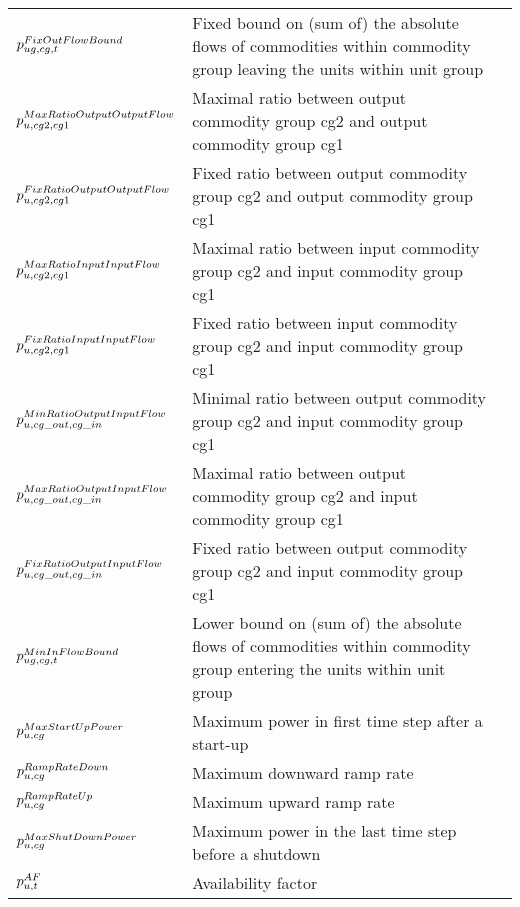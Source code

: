 \begin{longtable}{p{\cola} p{\colc} >{\small\raggedleft\arraybackslash\itshape}p{\colb}}
		$p^{FixOutFlowBound}_{ug,cg,t}$	& Fixed bound on (sum of) the absolute flows of commodities within commodity group \commoditygroup leaving the units within unit group \unitgroup 	&                \\
		$p^{MaxRatioOutputOutputFlow}_{u,cg2,cg1}$	& Maximal ratio between output commodity group cg2 and output commodity group cg1	&                \\
		$p^{FixRatioOutputOutputFlow}_{u,cg2,cg1}$	& Fixed ratio between output commodity group cg2 and output commodity group cg1	&                \\
		$p^{MaxRatioInputInputFlow}_{u,cg2,cg1}$	& Maximal ratio between input commodity group cg2 and input commodity group cg1	&                \\
		$p^{FixRatioInputInputFlow}_{u,cg2,cg1}$	& Fixed ratio between input commodity group cg2 and input commodity group cg1	&                \\
		$p^{MinRatioOutputInputFlow}_{u,cg\_out,cg\_in}$	& Minimal ratio between output commodity group cg2 and input commodity group cg1	&                \\
		$p^{MaxRatioOutputInputFlow}_{u,cg\_out,cg\_in}$	& Maximal ratio between output commodity group cg2 and input commodity group cg1	&                \\
		$p^{FixRatioOutputInputFlow}_{u,cg\_out,cg\_in}$	& Fixed ratio between output commodity group cg2 and input commodity group cg1	&                \\
		$p^{MinInFlowBound}_{ug,cg,t}$	& Lower bound on (sum of) the absolute flows of commodities within commodity group \commoditygroup entering the units within unit group \unitgroup 	&                \\
		$p^{MaxStartUpPower}_{u,cg}$	& Maximum power in first time step after a start-up           	&                \\
		$p^{RampRateDown}_{u,cg} $	& Maximum downward ramp rate                                  	&                \\
		$p^{RampRateUp}_{u,cg}   $	& Maximum upward ramp rate                                    	&                \\
		$p^{MaxShutDownPower}_{u,cg}$	& Maximum power in the last time step before a shutdown       	&                \\
		$p^{AF}_{u,t}           $	& Availability factor                                         	&                \\
	\end{longtable}

